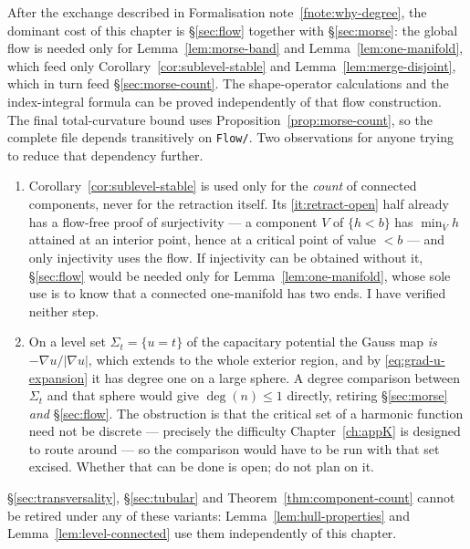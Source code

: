 \begin{fnote}\label{fnote:retire-flows}
After the exchange described in Formalisation note~\ref{fnote:why-degree}, the
dominant cost of this chapter is \S\ref{sec:flow} together with
\S\ref{sec:morse}: the global flow is needed only for
Lemma~\ref{lem:morse-band} and Lemma~\ref{lem:one-manifold}, which feed only
Corollary~\ref{cor:sublevel-stable} and Lemma~\ref{lem:merge-disjoint}, which
in turn feed \S\ref{sec:morse-count}.  The shape-operator calculations and
the index-integral formula can be proved independently of that flow
construction.  The final total-curvature bound uses
Proposition~\ref{prop:morse-count}, so the complete
 file depends transitively on
\texttt{Flow/}.  Two observations for anyone trying to reduce that dependency
further.
\begin{enumerate}[label=(\alph*)]
\item Corollary~\ref{cor:sublevel-stable} is used only for the \emph{count} of
  connected components, never for the retraction itself.  Its
  \ref{it:retract-open} half already has a flow-free proof of surjectivity ---
  a component $V$ of $\{h<b\}$ has $\min_{\overline V}h$ attained at an
  interior point, hence at a critical point of value $<b$ --- and only
  injectivity uses the flow.  If injectivity can be obtained without it,
  \S\ref{sec:flow} would be needed only for
  Lemma~\ref{lem:one-manifold}, whose sole use is to know that a connected
  one-manifold has two ends.  I have verified neither step.
\item On a level set $\Sigma_t=\{u=t\}$ of the capacitary potential the Gauss
  map \emph{is} $-\nabla u/|\nabla u|$, which extends to the whole exterior
  region, and by \eqref{eq:grad-u-expansion} it has degree one on a large
  sphere.  A degree comparison between $\Sigma_t$ and that sphere would give
  $\deg(n)\le1$ directly, retiring \S\ref{sec:morse} \emph{and}
  \S\ref{sec:flow}.  The obstruction is that the critical set of a harmonic
  function need not be discrete --- precisely the difficulty
  Chapter~\ref{ch:appK} is designed to route around --- so the comparison
  would have to be run with that set excised.  Whether that can be done is
  open; do not plan on it.
\end{enumerate}
\S\ref{sec:transversality}, \S\ref{sec:tubular} and
Theorem~\ref{thm:component-count} cannot be retired under any of these
variants: Lemma~\ref{lem:hull-properties} and
Lemma~\ref{lem:level-connected} use them independently of this chapter.
\end{fnote}

